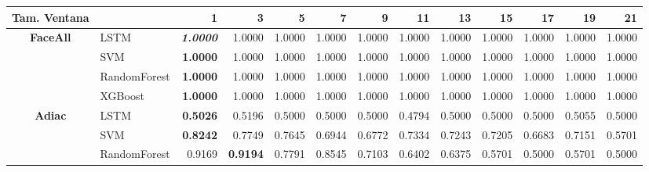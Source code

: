 \newpage
\begin{table}[H]
	\centering
	\begin{adjustbox}{max width=14cm}
		\begin{tabular}{|c|l|r|r|r|r|r|r|r|r|r|r|r|}
			\hline
			\textbf{Tam. Ventana} &              & 1                        & 3               & 5               & 7               & 9                        & 11              & 13     & 15     & 17              & 19                       & 21                       \\
			\hline
			\textbf{FaceAll}      & LSTM         & \textit{\textbf{1.0000}} & 1.0000          & 1.0000          & 1.0000          & 1.0000                   & 1.0000          & 1.0000 & 1.0000 & 1.0000          & 1.0000                   & 1.0000                   \\
			                      & SVM          & \textbf{1.0000}          & 1.0000          & 1.0000          & 1.0000          & 1.0000                   & 1.0000          & 1.0000 & 1.0000 & 1.0000          & 1.0000                   & 1.0000                   \\
			                      & RandomForest & \textbf{1.0000}          & 1.0000          & 1.0000          & 1.0000          & 1.0000                   & 1.0000          & 1.0000 & 1.0000 & 1.0000          & 1.0000                   & 1.0000                   \\
			                      & XGBoost      & \textbf{1.0000}          & 1.0000          & 1.0000          & 1.0000          & 1.0000                   & 1.0000          & 1.0000 & 1.0000 & 1.0000          & 1.0000                   & 1.0000                   \\
			\hline
			\textbf{Adiac}        & LSTM         & \textbf{0.5026}          & 0.5196          & 0.5000          & 0.5000          & 0.5000                   & 0.4794          & 0.5000 & 0.5000 & 0.5000          & 0.5055                   & 0.5000                   \\
			                      & SVM          & \textbf{0.8242}          & 0.7749          & 0.7645          & 0.6944          & 0.6772                   & 0.7334          & 0.7243 & 0.7205 & 0.6683          & 0.7151                   & 0.5701                   \\
			                      & RandomForest & 0.9169                   & \textbf{0.9194} & 0.7791          & 0.8545          & 0.7103                   & 0.6402          & 0.6375 & 0.5701 & 0.5000          & 0.5701                   & 0.5000                   \\

\end{tabular}
\end{adjustbox}
\end{table}
